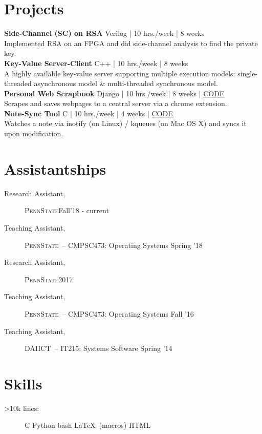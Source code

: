 \documentclass[margin]{res}
\newcommand{\daiict}{\textsc{DAIICT}}
\newcommand{\psu}{\textsc{PennState}}
\begin{document}
\begin{resume}
\section{Projects}
{\bfseries Side-Channel (SC) on RSA}\hfill
{\small Verilog | 10 hrs./week | 8 weeks}\\
Implemented RSA on an FPGA and did side-channel analysis to find the private key.\\[2ex]

{\bfseries Key-Value Server-Client}\hfill
{\small C++ | 10 hrs./week | 8 weeks}\\
A highly available key-value server supporting multiple execution models:
single-threaded asynchronous model \& multi-threaded synchronous model.\\[2ex]

{\bfseries Personal Web Scrapbook}\hfill
{\small Django | 10 hrs./week | 8 weeks | \href{https://bitbucket.org/mitthu/capsule/src/}{CODE}}\\
Scrapes and saves webpages to a central server via a chrome extension.\\[2ex]

{\bfseries Note-Sync Tool}\hfill
{\small C | 10 hrs./week | 4 weeks | \href{https://github.com/mitthu/note-sync}{CODE}}\\
Watches a note via inotify (on Linux) / kqueues (on Mac OS X) and syncs it upon modification.

\section{Assistantships} 
\begin{description}
    \item[Research Assistant,] \psu \hfill Fall'18 - current
    \item[Teaching Assistant,] \psu\ -- CMPSC473: Operating Systems \hfill Spring '18 %
    \item[Research Assistant,] \psu \hfill 2017
    \item[Teaching Assistant,] \psu\ -- CMPSC473: Operating Systems \hfill Fall '16 %
    \item[Teaching Assistant,] \daiict\ -- IT215: Systems Software \hfill Spring '14 %
\end{description}

\section{Skills}
\begin{description}
    \item[>10k lines:]
        C \textbullet{}
        Python \textbullet{}
        bash \textbullet{}
        \LaTeX\ (macros) \textbullet{}
        HTML


\end{description}
\end{resume}
\end{document}
